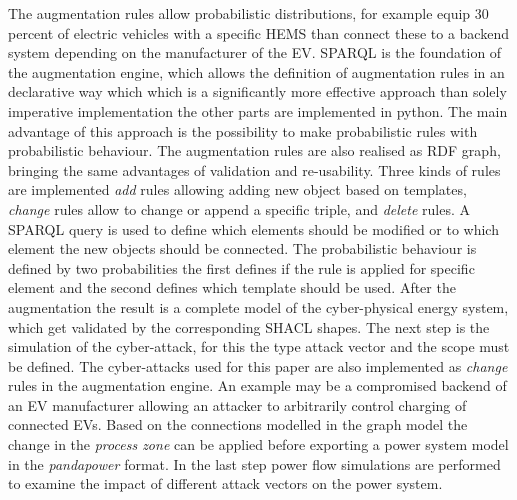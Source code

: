 The augmentation rules allow probabilistic distributions, for example equip 30 percent of electric vehicles with a specific \ac{HEMS} than connect these to a backend system depending on the manufacturer of the \ac{EV}.
\ac{SPARQL} is the foundation of the augmentation engine, which allows the definition of augmentation rules in an declarative way which which is a significantly more effective approach than solely imperative implementation the other parts are implemented in python.
The main advantage of this approach is the possibility to make probabilistic rules with probabilistic behaviour.
The augmentation rules are also realised as \ac{RDF} graph, bringing the same advantages of validation and re-usability.
Three kinds of rules are implemented \textit{add} rules allowing adding new object based on templates, \textit{change} rules allow to change or append a specific triple, and \textit{delete} rules.
A \ac{SPARQL} query is used to define which elements should be modified or to which element the new objects should be connected.
The probabilistic behaviour is defined by two probabilities the first defines if the rule is applied for specific element and the second defines which template should be used.
After the augmentation the result is a complete model of the cyber-physical energy system, which get validated by the corresponding \ac{SHACL} shapes.
The next step is the simulation of the cyber-attack, for this the type attack vector and the scope must be defined.
The cyber-attacks used for this paper are also implemented as \textit{change} rules in the augmentation engine.
An example may be a compromised backend of an \ac{EV} manufacturer allowing an attacker to arbitrarily control charging of connected \acp{EV}.
Based on the connections modelled in the graph model the change in the \textit{process zone} can be applied before exporting a power system model in the \textit{pandapower} format.
In the last step  power flow simulations are performed to examine the impact of different attack vectors on the power system.


